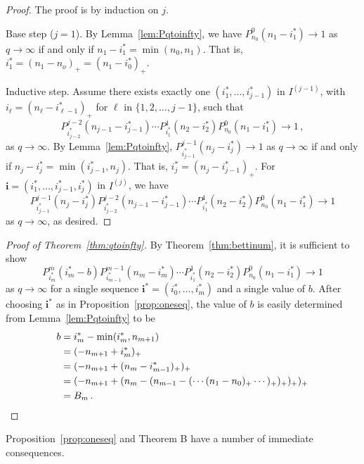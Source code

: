 \documentclass[3p,times]{elsarticle}
\theoremstyle{remark}
\newcommand{\ra}{\rightarrow}
\begin{document}
\begin{proof}
The proof is by induction on $j$.

Base step ($j=1$). By Lemma~\ref{lem:Pqtoinfty}, we have $P_{n_0}^0 (n_1 -
i_1^\ast) \to 1$ as $q\to\infty$ if and only if $n_1 - i_1^\ast = \min(n_0,
n_1)$.  That is, $i_1^\ast = (n_1 - n_o)_+ = (n_1 - i_0^\ast)_+$.

Inductive step. Assume there exists exactly one $(i_1^\ast,\ldots ,
i_{j-1}^\ast)$ in $I^{(j-1)}$, with $i_\ell = (n_\ell - i_{\ell-1}^\ast)_+$ for
$\ell$ in $\{1,2,\ldots, j-1\}$, such that 
\[
P_{i_{j-2}^\ast}^{j-2}(n_{j-1} - i_{j-1}^\ast) %
\cdots P_{i_1^\ast}^1 (n_2 - i_2^\ast) P_{n_0}^0 (n_1 - i_1^\ast) \to 1 \, ,
\]
as $q\to\infty$.  By Lemma~\ref{lem:Pqtoinfty}, $P_{i_{j-1}^\ast}^{j-1}(n_j -
i_j^\ast) \to 1$ as $q \to \infty$ if and only if $n_j - i_j^\ast =
\min(i_{j-1}^\ast, n_j)$. That is, $i_j^\ast = (n_j - i_{j-1}^\ast)_+$.  
For $\mathbf{i} = (i_1^\ast,\ldots, i_{j-1}^\ast, i_j^\ast)$ in $I^{(j)}$, we
have
\[
P_{i_{j-1}^\ast}^{j-1}(n_j-i_j^\ast)P_{i_{j-2}^\ast}^{j-2}(n_{j-1}-i_{j-1}^\ast)\cdots P_{i_1^\ast}^1(n_2-i_2^\ast)P_{n_0}^0(n_1-i_1^\ast) \to 1
\]
as $q\to\infty$, as desired.
\end{proof}

\begin{proof}[Proof of Theorem~\ref{thm:qtoinfty}]
  By Theorem~\ref{thm:bettinum}, it is sufficient to show
  \[
    P^m_{i_m^\ast}(i_m^\ast-b) P_{i^\ast_{m-1}}^{m-1}\left(n_{m} -i_m^\ast\right) \cdots
    P_{i_1^\ast}^1\left(n_2 - i_2^\ast\right) P_{n_0}^0 \left(n_1 - i_1^\ast\right) \to 1 
  \]
  as $q \ra \infty$ for a single sequence $\mathbf{i}^\ast=(i_0^\ast, \ldots,
  i_m^\ast)$ and a single
  value of $b$. After choosing $\mathbf{i}^\ast$ as in Proposition~\ref{prop:oneseq},
  the value of $b$ is easily determined from Lemma~\ref{lem:Pqtoinfty} to be
	\begin{align*}
	b 	&= i_m^\ast - \min(i_m^\ast, n_{m+1})\\
		&= (-n_{m+1} + i_m^\ast)_+\\
		&= (-n_{m+1} + (n_m -i_{m-1}^\ast)_+)_+\\
		&= (-n_{m+1} + (n_m - (n_{m-1} - (\cdots (n_1 - n_0)_+ \cdots)_+)_+)_+ )_+\\
        &= B_m \, . \qedhere
	\end{align*}
\end{proof}

Proposition~\ref{prop:oneseq} and Theorem B have a number of immediate consequences.
\end{document}
